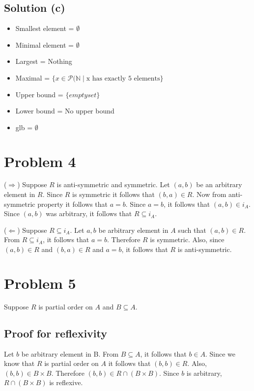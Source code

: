 \documentclass{article}
\begin{document}
\subsection{Solution (c)}
\begin{itemize}
\item Smallest element = $\emptyset$
\item Minimal element = $\emptyset$
\item Largest = Nothing
\item Maximal =  $\{x \in \mathcal{P}(\mathbb{N} \mid \text{x has
    exactly 5 elements}\}$
\item Upper bound = $\{emptyset\}$
\item Lower bound = No upper bound
\item glb = $\emptyset$
\end{itemize}

\section{Problem 4}

($\Rightarrow$) Suppose $R$ is anti-symmetric and symmetric. Let
$(a,b)$ be an arbitrary element in $R$. Since $R$ is symmetric it
follows that $(b,a) \in R$. Now from anti-symmetric property it
follows that $a = b$. Since $a = b$, it follows that $(a,b) \in i_A$.
Since $(a,b)$ was arbitrary, it follows that $R \subseteq i_A$.

($\Leftarrow$) Suppose $R \subseteq i_A$. Let $a,b$ be arbitrary
element in $A$ such that $(a,b) \in R$. From $R \subseteq i_A$, it
follows that $a = b$. Therefore $R$ is symmetric. Also, since
$(a,b) \in R$ and $(b,a) \in R$ and $a = b$, it follows that $R$ is
anti-symmetric.

\section{Problem 5}
Suppose $R$ is partial order on $A$ and $B \subseteq A$.

\subsection{Proof for reflexivity}

Let $b$ be arbitrary element in B. From $B \subseteq A$, it follows
that $b \in A$. Since we know that $R$ is partial order on $A$ it
follows that $(b,b) \in R$. Also, $(b,b) \in B \times B$. Therefore
$(b,b) \in R \cap (B \times B)$. Since $b$ is arbitrary, $R \cap (B
\times B)$ is reflexive.
\end{document}
